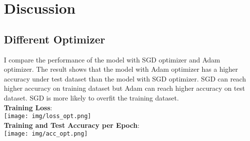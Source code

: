 \documentclass{article} %
\begin{document}
    \section{Discussion}
    \subsection{Different Optimizer}
    I compare the performance of the model with SGD optimizer and Adam optimizer.
    The result shows that the model with Adam optimizer has a higher accuracy under test dataset than the model with SGD optimizer.
    SGD can reach higher accuracy on training dataset but Adam can reach higher accuracy on test dataset.
    SGD is more likely to overfit the training dataset. \\
    \textbf{Training Loss}: \\
    \texttt{[image: img/loss\_opt.png]} \\
    \textbf{Training and Test Accuracy per Epoch}: \\
    \texttt{[image: img/acc\_opt.png]} \\
    
\end{document}
